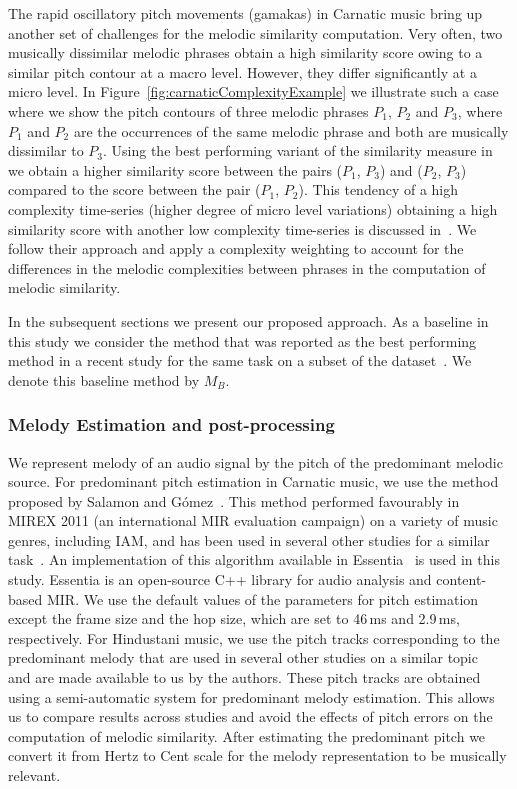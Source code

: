 The rapid oscillatory pitch movements (gamakas) in Carnatic music bring up another set of challenges for the melodic similarity computation. Very often, two musically dissimilar melodic phrases obtain a high similarity score owing to a similar pitch contour at a macro level. However, they differ significantly at a micro level. In Figure~\ref{fig:carnaticComplexityExample} we illustrate such a case where we show the pitch contours of three melodic phrases $P_1$, $P_2$ and $P_3$, where $P_1$ and $P_2$ are the occurrences of the same melodic phrase and both are musically dissimilar to $P_3$. Using the best performing variant of the similarity measure in~\cite{gulati_ICASSP2015} we obtain a higher similarity score between the pairs ($P_1$, $P_3$) and ($P_2$, $P_3$) compared to the score between the pair ($P_1$, $P_2$). This tendency of a high complexity time-series (higher degree of micro level variations) obtaining a high similarity score with another low complexity time-series is discussed in~\cite{batista2011complexity}. We follow their approach and apply a complexity weighting to account for the differences in the melodic complexities between phrases in the computation of melodic similarity. 

In the subsequent sections we present our proposed approach. As a baseline in this study we consider the method that was reported as the best performing method in a recent study for the same task on a subset of the dataset~\cite{gulati_ICASSP2015}. We denote this baseline method by $M_{B}$.


\subsubsection{Melody Estimation and post-processing}
\label{sec:patterns_improving_similarity_melody_estimation}

We represent melody of an audio signal by the pitch of the predominant melodic source. For predominant pitch estimation in Carnatic music, we use the method proposed by Salamon and G\'omez~\cite{Salamon2012}. This method performed favourably in MIREX 2011 (an international  MIR evaluation campaign) on a variety of music genres, including IAM, and has been used in several other studies for a similar task~\cite{gulati_ICASSP2015, gulati_SITIS_2014, Dutta2014}. An implementation of this algorithm available in Essentia~\cite{essentia} is used in this study. Essentia is an open-source C++ library for audio analysis and content-based MIR. We use the default values of the parameters for pitch estimation except the frame size and the hop size, which are set to 46\,ms and 2.9\,ms, respectively. For Hindustani music, we use the pitch tracks corresponding to the predominant melody that are used in several other studies on a similar topic~\cite{Ross2012b, Rao2014} and are made available to us by the authors. These pitch tracks are obtained using a semi-automatic system for predominant melody estimation. This allows us to compare results across studies and avoid the effects of pitch errors on the computation of melodic similarity. After estimating the predominant pitch we convert it from Hertz to Cent scale for the melody representation to be musically relevant.

